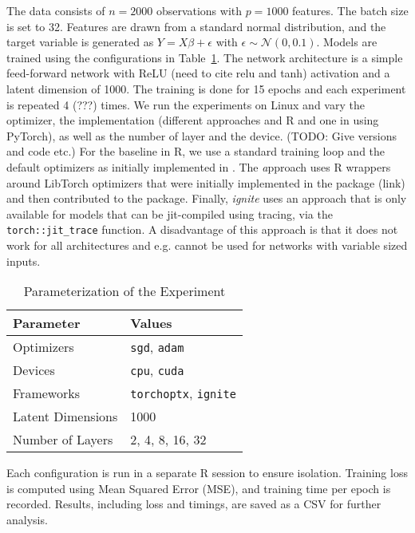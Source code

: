 \documentclass[article, nojss]{jss}
\theoremstyle{definition}
\begin{document}
The data consists of $n = 2000$ observations with $p = 1000$ features. The batch size is set to 32.
Features are drawn from a standard normal distribution, and the target variable is generated as $Y = X\beta + \epsilon$ with $\epsilon \sim \mathcal{N}(0, 0.1)$.
Models are trained using the configurations in Table~\ref{tab:config}.
The network architecture is a simple feed-forward network with ReLU (need to cite relu and tanh) activation and a latent dimension of 1000.
The training is done for 15 epochs and each experiment is repeated 4 (???) times.
We run the experiments on Linux and vary the optimizer, the implementation (different approaches and R and one in \python{} using PyTorch), as well as the number of layer and the device. (TODO: Give versions and code etc.)
For the baseline in R, we use a standard training loop and the default optimizers as initially implemented in .
The \textit approach uses R wrappers around LibTorch \cpp{} optimizers that were initially implemented in the  package (link) and then contributed to the  package.
Finally, \textit{ignite} uses an approach that is only available for models that can be jit-compiled using tracing, via the \texttt{torch::jit_trace} function.
A disadvantage of this approach is that it does not work for all architectures and e.g. cannot be used for networks with variable sized inputs.


\begin{table}[h]
\centering
\caption{Parameterization of the Experiment}
\label{tab:config}
\begin{tabular}{ll}
\toprule
\textbf{Parameter} & \textbf{Values} \\
\midrule
Optimizers & \texttt{sgd}, \texttt{adam} \\
Devices & \texttt{cpu}, \texttt{cuda} \\
Frameworks & \texttt{torchoptx}, \texttt{ignite} \\
Latent Dimensions & 1000 \\
Number of Layers & 2, 4, 8, 16, 32 \\
\bottomrule
\end{tabular}
\end{table}



Each configuration is run in a separate R session to ensure isolation. Training loss is computed using Mean Squared Error (MSE), and training time per epoch is recorded. Results, including loss and timings, are saved as a CSV for further analysis.
\end{document}
